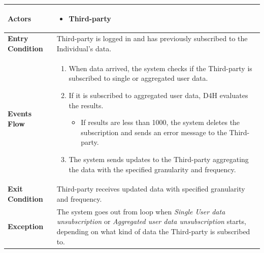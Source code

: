             \begin{table}[H]
            	\centering
                
                \begin{tabular}{|p{3cm}|p{8.2cm}|}
                    \hline
                    \textbf{Actors} &  \begin{itemize}
                                            \item Third-party
                                        \end{itemize}\\
                     \hline
                    \textbf{Entry Condition} & Third-party is logged in and has previously subscribed to the Individual's data.\\
                     \hline
                    \textbf{Events Flow} & \begin{enumerate}
                        \item When data arrived, the system checks if the Third-party is subscribed to single or aggregated user data.
                        \item If it is subscribed to aggregated user data, D4H evaluates the results.
                        \begin{itemize}
                            \item If results are less than 1000, the system deletes the subscription and sends an error message to the Third-party.
                        \end{itemize}
                        \item The system sends updates to the Third-party aggregating the data with the specified granularity and frequency. \end{enumerate}\\
                     \hline
                    \textbf{Exit Condition} & Third-party receives updated data with specified granularity and frequency. \\
                     \hline
                    \textbf{Exception} & The system goes out from loop when
                    \emph{Single User data unsubscription} or \emph{Aggregated user data unsubscription} starts, depending on what kind of data the Third-party is subscribed to. \\
                     \hline
                \end{tabular}  
            \end{table} 
            
